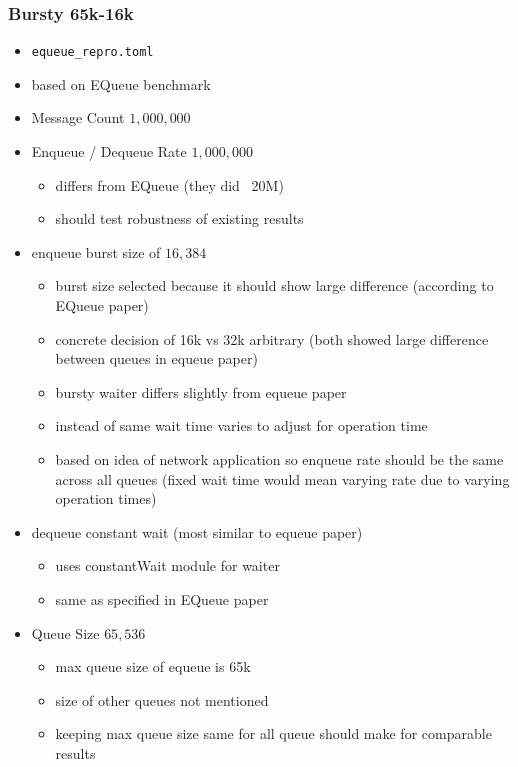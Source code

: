 \subsubsection{Bursty 65k-16k}
\label{sec:bench-bursty-65k-16k}
\begin{itemize}
    \item \texttt{equeue\_repro.toml}
    \item based on EQueue benchmark
    \item Message Count $1,000,000$
    \item Enqueue / Dequeue Rate $1,000,000$
        \begin{itemize}
            \item differs from EQueue (they did ~20M)
            \item should test robustness of existing results 
        \end{itemize}
    \item enqueue burst size of $16,384$
        \begin{itemize}
            \item burst size selected because it should show large difference (according to EQueue paper)
            \item concrete decision of 16k vs 32k arbitrary (both showed large difference between queues in equeue paper)
            \item bursty waiter differs slightly from equeue paper
            \item instead of same wait time varies to adjust for operation time
            \item based on idea of network application so enqueue rate should be the same across all queues (fixed wait time would mean varying rate due to varying operation times)
        \end{itemize}
    \item dequeue constant wait (most similar to equeue paper)
        \begin{itemize}
            \item uses constantWait module for waiter
            \item same as specified in EQueue paper
        \end{itemize}
    \item Queue Size $65,536$
        \begin{itemize}
            \item max queue size of equeue is 65k
            \item size of other queues not mentioned
            \item keeping max queue size same for all queue should make for comparable results
        \end{itemize}
\end{itemize}

